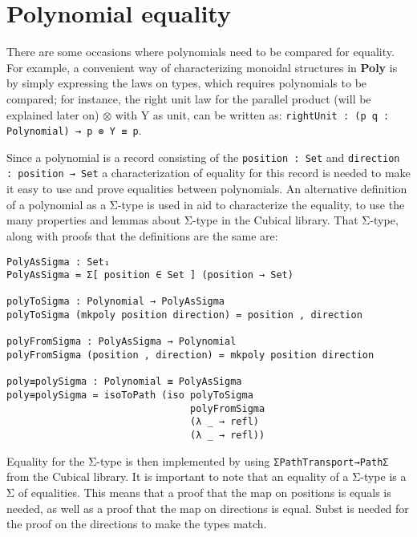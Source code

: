 \section{Polynomial equality}
There are some occasions where polynomials need to be compared for equality. For example, a convenient way of characterizing monoidal structures in \textbf{Poly} is by simply expressing the laws on types, which requires polynomials to be compared; for instance, the right unit law for the parallel product (will be explained later on) $\otimes$ with Y as unit, can be written as: \texttt{rightUnit : (p q : Polynomial) → p ⊗ Y ≡ p}.

Since a polynomial is a record consisting of the \texttt{position : Set} and \newline \texttt{direction : position → Set} a characterization of equality for this record is needed to make it easy to use and prove equalities between polynomials.
An alternative definition of a polynomial as a Σ-type is used in aid to characterize the equality, to use the many properties and lemmas about Σ-type in the Cubical library.
That Σ-type, along with proofs that the definitions are the same are:

\begin{verbatim}
PolyAsSigma : Set₁
PolyAsSigma = Σ[ position ∈ Set ] (position → Set)

polyToSigma : Polynomial → PolyAsSigma
polyToSigma (mkpoly position direction) = position , direction
    
polyFromSigma : PolyAsSigma → Polynomial
polyFromSigma (position , direction) = mkpoly position direction

poly≡polySigma : Polynomial ≡ PolyAsSigma
poly≡polySigma = isoToPath (iso polyToSigma 
                                polyFromSigma 
                                (λ _ → refl) 
                                (λ _ → refl))
\end{verbatim}

Equality for the Σ-type is then implemented by using \texttt{ΣPathTransport→PathΣ} from the Cubical library.
It is important to note that an equality of a Σ-type is a Σ of equalities.
This means that a proof that the map on positions is equals is needed, as well as a proof that the map on directions is equal.
Subst is needed for the proof on the directions to make the types match.

